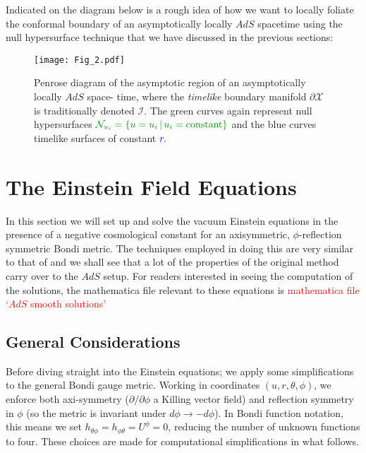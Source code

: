 \documentclass[a4paper,11pt]{article}
\numberwithin{equation}{section}
\begin{document}
Indicated on the diagram below is a rough idea of how we want to locally foliate the conformal boundary of an asymptotically locally $AdS$ spacetime using the null hypersurface technique that we have discussed in the previous sections: \newpage

\begin{figure}[H]
\begin{center}
	\texttt{[image: Fig\_2.pdf]}
	\caption{Penrose diagram of the asymptotic region of an asymptotically locally $AdS$ space-	time, where the \textit{timelike} boundary manifold $\partial \mathcal{X}$ is traditionally 		denoted $\mathscr{I}$. The \textcolor{islamicgreen}{green} curves again represent null 		hypersurfaces $\color{islamicgreen}{\mathcal{N}_{u_i}} =\{ u= u_i \, | \, u_i = \text{constant} \}$  	and the blue curves timelike surfaces of constant $\color{blue}{r}.$}
\end{center}	
\end{figure}

\section{The Einstein Field Equations}

In this section we will set up and solve the vacuum Einstein equations in the presence of a negative cosmological constant for an axisymmetric, $\phi$-reflection symmetric Bondi metric. The techniques employed in doing this are very similar to that of \cite{Bondi:1962px} and we shall see that a lot of the properties of the original method carry over to the $AdS$ setup. For readers interested in seeing the computation of the solutions, the mathematica file relevant to these equations is \textcolor{red}{mathematica file `$AdS$ smooth solutions'}

\subsection{General Considerations}
Before diving straight into the Einstein equations; we apply some simplifications to the general Bondi gauge metric. Working in coordinates $(u , r, \theta, \phi)$, we enforce both axi-symmetry ($\partial/\partial \phi$ a Killing vector field) and reflection symmetry in $\phi$ (so the metric is invariant under $d\phi \rightarrow -d\phi$). In Bondi function notation, this means we set $h_{\theta \phi}=h_{\phi \theta}=U^{\phi}=0$, reducing the number of unknown functions to four. These choices are made for computational simplifications in what follows.
\end{document}
